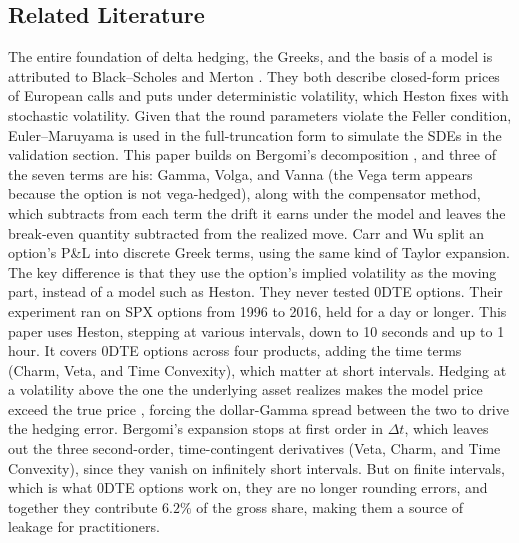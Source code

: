 \documentclass[11pt]{article}
\begin{document}
\subsection{Related Literature}
The entire foundation of delta hedging, the Greeks, and the basis of a model is attributed to Black--Scholes \cite{blackscholes1973} and Merton \cite{merton1973}. They both
describe closed-form prices of European calls and puts under deterministic volatility, which Heston \cite{heston1993} fixes with stochastic volatility. Given that the round parameters violate the Feller condition, Euler--Maruyama \cite{Maruyama1955} is used in the full-truncation form \cite{lord2010} to simulate the SDEs in the validation section. This paper builds on Bergomi's decomposition \cite{bergomi2016},
and three of the seven terms are his: Gamma, Volga, and Vanna (the Vega term appears because the option is not vega-hedged), along with the compensator method, which subtracts from each term the drift it earns under the model and leaves the break-even quantity subtracted from the realized move.
Carr and Wu \cite{carrwu2020} split an option's P\&L into discrete Greek terms, using the same kind of Taylor expansion. The key difference is that they use the option's implied volatility as the moving part, instead of a model such as Heston. They never tested 0DTE options. Their experiment ran on SPX options from 1996 to 2016, held for a day or longer.
This paper uses Heston, stepping at various intervals, down to 10 seconds and up to 1 hour. It covers 0DTE options across four products, adding the time terms (Charm, Veta, and Time Convexity), which matter at short intervals.
Hedging at a volatility above the one the underlying asset realizes makes the model price exceed the true price \cite{elkaroui1998}, forcing the dollar-Gamma spread between the two to drive the
 hedging error. Bergomi's expansion stops at first order in $\Delta t$, which leaves out the three second-order, time-contingent derivatives (Veta, Charm, and Time Convexity), since they vanish on infinitely short intervals. But on finite intervals, which is what 0DTE options work on, they are no longer rounding errors, and together they contribute $6.2\%$ of the gross share, making them a source of leakage for practitioners.
\end{document}
